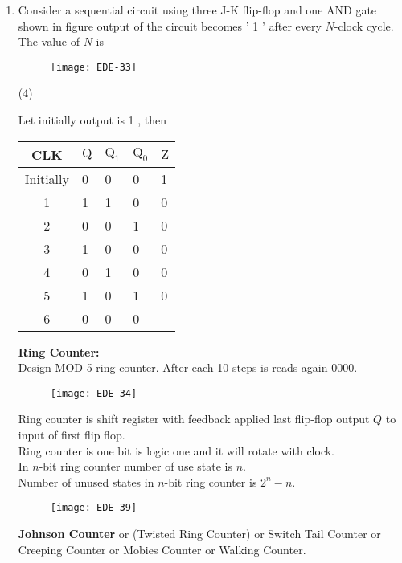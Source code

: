 \begin{enumerate}
\begin{answer}
\end{answer}
\item Consider a sequential circuit using three J-K flip-flop and one AND gate shown in figure output of the circuit becomes ' 1 ' after every $N$-clock cycle. The value of $N$ is
\begin{figure}[H]
	\centering
	\texttt{[image: EDE-33]}
\end{figure}
 \begin{tasks}(4)
\end{tasks}
\begin{answer}
Let initially output is 1 , then\\
\begin{tabular}{|cllll|}
	\hline CLK & $\mathrm{Q}$ & $\mathrm{Q}_{1}$ & $\mathrm{Q}_{0}$ & $\mathrm{Z}$ \\
	\hline Initially & 0 & 0 & 0 & 1 \\
	\hline 1 & 1 & 1 & 0 & 0 \\
	2 & 0 & 0 & 1 & 0 \\
	3 & 1 & 0 & 0 & 0 \\
	4 & 0 & 1 & 0 & 0 \\
	5 & 1 & 0 & 1 & 0 \\
	6 & 0 & 0 & 0 & \\
	\hline
\end{tabular}
\end{answer}
\textbf{Ring Counter:}\\
Design MOD-5 ring counter. After each 10 steps is reads again 0000.
\begin{figure}[H]
	\centering
	\texttt{[image: EDE-34]}
\end{figure}
Ring counter is shift register with feedback applied last flip-flop output $Q$ to input of first flip flop.\\
Ring counter is one bit is logic one and it will rotate with clock.\\
In $n$-bit ring counter number of use state is $n$.\\
Number of unused states in $n$-bit ring counter is $2^{n}-n$.
\begin{figure}[H]
	\centering
	\texttt{[image: EDE-39]}
\end{figure}
\textbf{Johnson Counter } or (Twisted Ring Counter) or Switch Tail Counter or Creeping Counter or Mobies Counter or Walking Counter.
\begin{figure}[H]

\end{figure}
\end{enumerate}
